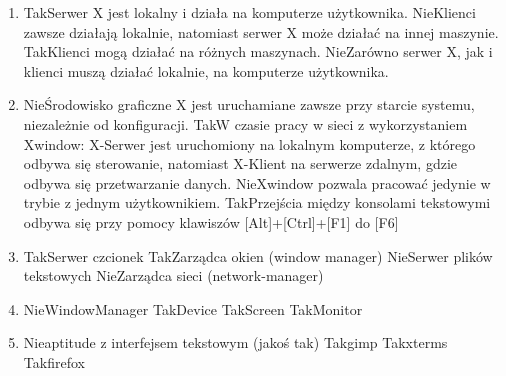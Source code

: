 \begin{enumerate}
	\item {}
	{Tak}{Serwer X jest lokalny i działa na komputerze użytkownika.}
	{Nie}{Klienci zawsze działają lokalnie, natomiast serwer X może działać na innej maszynie.}
	{Tak}{Klienci mogą działać na różnych maszynach.}
	{Nie}{Zarówno serwer X, jak i klienci muszą działać lokalnie, na komputerze użytkownika.}
	
	\item {}
	{Nie}{Środowisko graficzne X jest uruchamiane zawsze przy starcie systemu, niezależnie od konfiguracji.}
	{Tak}{W czasie pracy w sieci z wykorzystaniem Xwindow: X-Serwer jest uruchomiony na lokalnym komputerze, z którego odbywa się sterowanie, natomiast X-Klient na serwerze zdalnym, gdzie odbywa się przetwarzanie danych.}
	{Nie}{Xwindow pozwala pracować jedynie w trybie z jednym użytkownikiem.}
	{Tak}{Przejścia między konsolami tekstowymi odbywa się przy pomocy klawiszów [Alt]+[Ctrl]+[F1] do [F6]}
	
	\item {}
	{Tak}{Serwer czcionek}
	{Tak}{Zarządca okien (window manager)}
	{Nie}{Serwer plików tekstowych}
	{Nie}{Zarządca sieci (network-manager)}
	
	\item {}
	{Nie}{WindowManager}
	{Tak}{Device}
	{Tak}{Screen}
	{Tak}{Monitor}
	
	\item {}
	{Nie}{aptitude z interfejsem tekstowym (jakoś tak)}
	{Tak}{gimp}
	{Tak}{xterms}
	{Tak}{firefox}
	
\end{enumerate}
